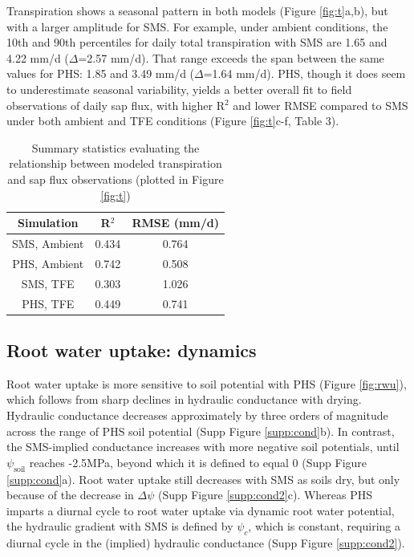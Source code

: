 \documentclass[draft,linenumbers]{agujournal}
\begin{document}
    Transpiration shows a seasonal pattern in both models (Figure \ref{fig:t}a,b), but with a larger amplitude for SMS.
    For example, under ambient conditions, the 10th and 90th percentiles for daily total transpiration with SMS are 1.65 and 4.22 mm/d ($\Delta$=2.57 mm/d).
    That range exceeds the span between the same values for PHS: 1.85 and 3.49 mm/d ($\Delta$=1.64 mm/d). 
    PHS, though it does seem to underestimate seasonal variability, yields a better overall fit to field observations of daily sap flux, with higher R$^2$  and lower RMSE compared to SMS 
    under both ambient and TFE conditions (Figure \ref{fig:t}c-f, Table 3).
    
    \begin{table}[h]
\caption{Summary statistics evaluating the relationship between modeled transpiration and sap flux observations (plotted in Figure \ref{fig:t})}
\label{tab:sapflux}
\centering
\begin{tabular}{c c c }
Simulation & R$^2$ & RMSE (mm/d) \\
\hline
SMS, Ambient & 0.434 & 0.764 \\
PHS, Ambient & 0.742 & 0.508 \\
SMS, TFE & 0.303 & 1.026 \\
PHS, TFE & 0.449 & 0.741 \\
\hline
\end{tabular}
\end{table}

    
\subsection{Root water uptake: dynamics}
    Root water uptake is more sensitive to soil potential with PHS (Figure \ref{fig:rwu}),
    which follows from sharp declines in hydraulic conductance with drying.
    Hydraulic conductance decreases approximately by three orders of magnitude across the range of PHS soil potential (Supp Figure \ref{supp:cond}b).
    In contrast, the SMS-implied conductance increases with more negative soil potentials, until $\psi_{\text{soil}}$ reaches -2.5MPa, beyond which it is defined to equal 0 (Supp Figure \ref{supp:cond}a).
    Root water uptake still decreases with SMS as soils dry, but only because of the decrease in $\Delta\psi$ (Supp Figure \ref{supp:cond2}c).
    Whereas PHS imparts a diurnal cycle to root water uptake via dynamic root water potential, 
    the hydraulic gradient with SMS is defined by $\psi_c$, which is constant, requiring a diurnal cycle in the (implied) hydraulic conductance (Supp Figure \ref{supp:cond2}).
    
\end{document}
